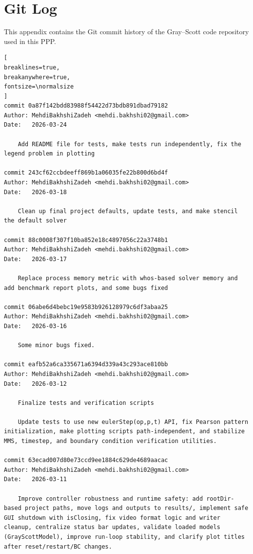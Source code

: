 \chapter{Git Log}
\label{app:gitlog}

This appendix contains the Git commit history of the Gray--Scott code repository used in this PPP.

\begin{Verbatim}[
breaklines=true,
breakanywhere=true,
fontsize=\normalsize
]
commit 0a87f142bdd83988f54422d73bdb891dbad79182
Author: MehdiBakhshiZadeh <mehdi.bakhshi02@gmail.com>
Date:   2026-03-24

    Add README file for tests, make tests run independently, fix the legend problem in plotting

commit 243cf62ccbdeeff869b1a06035fe22b800d6bd4f
Author: MehdiBakhshiZadeh <mehdi.bakhshi02@gmail.com>
Date:   2026-03-18

    Clean up final project defaults, update tests, and make stencil the default solver

commit 88c0008f307f10ba852e18c4897056c22a3748b1
Author: MehdiBakhshiZadeh <mehdi.bakhshi02@gmail.com>
Date:   2026-03-17

    Replace process memory metric with whos-based solver memory and add benchmark report plots, and some bugs fixed

commit 06abe6d4bebc19e9583b926128979c6df3abaa25
Author: MehdiBakhshiZadeh <mehdi.bakhshi02@gmail.com>
Date:   2026-03-16

    Some minor bugs fixed.

commit eafb52a6ca335671a6394d339a43c293ace810bb
Author: MehdiBakhshiZadeh <mehdi.bakhshi02@gmail.com>
Date:   2026-03-12

    Finalize tests and verification scripts
    
    Update tests to use new eulerStep(op,p,t) API, fix Pearson pattern initialization, make plotting scripts path-independent, and stabilize MMS, timestep, and boundary condition verification utilities.

commit 63ecad007d80e73ccd9ee1884c629de4689aacac
Author: MehdiBakhshiZadeh <mehdi.bakhshi02@gmail.com>
Date:   2026-03-11

    Improve controller robustness and runtime safety: add rootDir-based project paths, move logs and outputs to results/, implement safe GUI shutdown with isClosing, fix video format logic and writer cleanup, centralize status bar updates, validate loaded models (GrayScottModel), improve run-loop stability, and clarify plot titles after reset/restart/BC changes.


\end{Verbatim}

